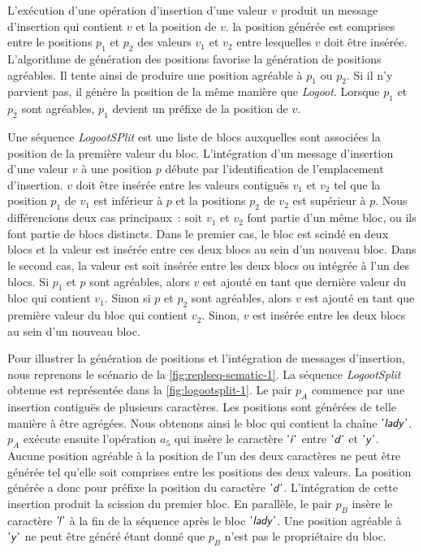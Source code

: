 L'exécution d'une opération d'insertion d'une valeur $v$ produit un message d'insertion qui contient $v$ et la position de $v$.
la position générée est comprises entre le positions $p_1$ et $p_2$ des valeurs $v_1$ et $v_2$ entre lesquelles $v$ doit être insérée.
L'algorithme de génération des positions favorise la génération de positions agréables.
Il tente ainsi de produire une position agréable à $p_1$ ou $p_2$.
Si il n'y parvient pas, il génère la position de la même manière que \emph{Logoot}.
Lorsque $p_1$ et $p_2$ sont agréables, $p_1$ devient un préfixe de la position de $v$.

Une séquence \emph{LogootSPlit} est une liste de blocs auxquelles sont associées la position de la première valeur du bloc.
L'intégration d'un message d'insertion d'une valeur $v$ à une position $p$ débute par l'identification de l'emplacement d'insertion.
$v$ doit être insérée entre les valeurs contiguës $v_1$ et $v_2$ tel que la position $p_1$ de $v_1$ est inférieur à $p$ et la positions $p_2$ de $v_2$ est supérieur à $p$.
Nous différencions deux cas principaux~: soit $v_1$ et $v_2$ font partie d'un même bloc, ou ils font partie de blocs distincts.
Dans le premier cas, le bloc est scindé en deux blocs et la valeur est insérée entre ces deux blocs au sein d'un nouveau bloc.
Dans le second cas, la valeur est soit insérée entre les deux blocs ou intégrée à l'un des blocs.
Si $p_1$ et $p$ sont agréables, alors $v$ est ajouté en tant que dernière valeur du bloc qui contient $v_1$.
Sinon si $p$ et $p_2$ sont agréables, alors $v$ est ajouté en tant que première valeur du bloc qui contient $v_2$.
Sinon, $v$ est insérée entre les deux blocs au sein d'un nouveau bloc.

Pour illustrer la génération de positions et l'intégration de messages d'insertion, nous reprenons le scénario de la \autoref{fig:replseq-sematic-1}.
La séquence \emph{LogootSplit} obtenue est représentée dans la \autoref{fig:logootsplit-1}.
Le pair $p_A$ commence par une insertion contiguës de plusieurs caractères.
Les positions sont générées de telle manière à être agrégées.
Nous obtenons ainsi le bloc qui contient la chaîne $\textsf{'\textit{lady}'}$.
$p_A$ exécute ensuite l'opération $a_5$ qui insère le caractère $\textsf{'\textit{i}'}$ entre $\textsf{'\textit{d}'}$ et $\textsf{'\textit{y}'}$.
Aucune position agréable à la position de l'un des deux caractères ne peut être générée tel qu'elle soit comprises entre les positions des deux valeurs.
La position générée a donc pour préfixe la position du caractère $\textsf{'\textit{d}'}$.
L'intégration de cette insertion produit la scission du premier bloc.
En parallèle, le pair $p_B$ insère le caractère $\textsf{'\textit{\negthinspace!}'}$ à la fin de la séquence après le bloc $\textsf{'\textit{lady}'}$.
Une position agréable à $\textsf{'\textit{y}'}$ ne peut être généré étant donné que $p_B$ n'est pas le propriétaire du bloc.

